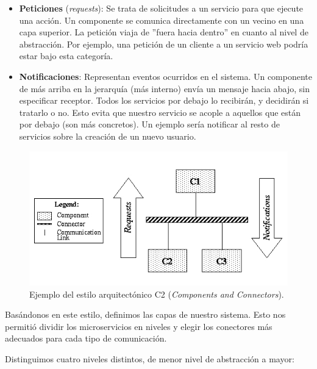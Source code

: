 \begin{itemize}
  \item \textbf{Peticiones} (\emph{requests}): Se trata de solicitudes a un servicio para que ejecute una acción. Un componente se comunica directamente con un vecino en una capa superior. La petición viaja de ''fuera hacia dentro'' en cuanto al nivel de abstracción. Por ejemplo, una petición de un cliente a un servicio web podría estar bajo esta categoría.

  \item \textbf{Notificaciones}: Representan eventos ocurridos en el sistema. Un componente de más arriba en la jerarquía (más interno) envía un mensaje hacia abajo, sin especificar receptor. Todos los servicios por debajo lo recibirán, y decidirán si tratarlo o no. Esto evita que nuestro servicio se acople a aquellos que están por debajo (son más concretos). Un ejemplo sería notificar al resto de servicios sobre la creación de un nuevo usuario.
\end{itemize}

\begin{figure}[htb]
  \centering
  \includegraphics[scale=0.45]{cap_arquitectura/images/c2SampleArch}
  \caption[Ejemplo del estilo arquitectónico C2 (\emph{Components and Connectors})]{Ejemplo del estilo arquitectónico C2 (\emph{Components and Connectors}). \cite{UCISoftwareArchitecture}}
  \label{fig:C2-arch-example}
\end{figure}

Basándonos en este estilo, definimos las capas de nuestro sistema. Esto nos permitió dividir los microservicios en niveles y elegir los conectores más adecuados para cada tipo de comunicación.

Distinguimos cuatro niveles distintos, de menor nivel de abstracción a mayor:

